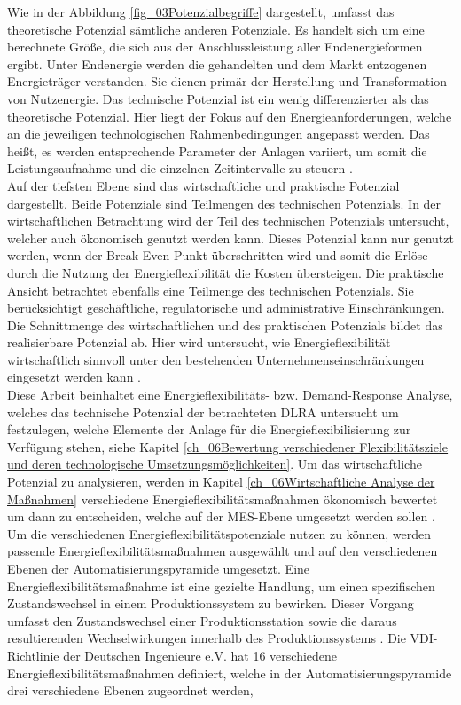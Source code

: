Wie in der Abbildung \ref*{fig_03Potenzialbegriffe} dargestellt, umfasst das theoretische Potenzial sämtliche anderen Potenziale. Es handelt sich um eine berechnete Größe, die sich aus der Anschlussleistung aller Endenergieformen ergibt. Unter Endenergie werden die gehandelten und dem Markt entzogenen Energieträger verstanden. Sie dienen primär der Herstellung und Transformation von Nutzenergie. Das technische Potenzial ist ein wenig differenzierter als das theoretische Potenzial. Hier liegt der Fokus auf den Energieanforderungen, welche an die jeweiligen technologischen Rahmenbedingungen angepasst werden. Das heißt, es werden entsprechende Parameter der Anlagen variiert, um somit die Leistungsaufnahme und die einzelnen Zeitintervalle zu steuern \cite{VDI5207Blatt2020}.\\

Auf der tiefsten Ebene sind das wirtschaftliche und praktische Potenzial dargestellt. Beide Potenziale sind Teilmengen des technischen Potenzials. In der wirtschaftlichen Betrachtung wird der Teil des technischen Potenzials untersucht, welcher auch ökonomisch genutzt werden kann. Dieses Potenzial kann nur genutzt werden, wenn der Break-Even-Punkt überschritten wird und somit die Erlöse durch die Nutzung der Energieflexibilität die Kosten übersteigen. Die praktische Ansicht betrachtet ebenfalls eine Teilmenge des technischen Potenzials. Sie berücksichtigt geschäftliche, regulatorische und administrative Einschränkungen. Die Schnittmenge des wirtschaftlichen und des praktischen Potenzials bildet das realisierbare Potenzial ab. Hier wird untersucht, wie Energieflexibilität wirtschaftlich sinnvoll unter den bestehenden Unternehmenseinschränkungen eingesetzt werden kann \cite{VDI5207Blatt2020}.\\

Diese Arbeit beinhaltet eine Energieflexibilitäts- bzw. Demand-Response Analyse, welches das technische Potenzial der betrachteten DLRA untersucht um festzulegen, welche Elemente der Anlage für die Energieflexibilisierung zur Verfügung stehen, siehe Kapitel \ref{ch_06Bewertung verschiedener Flexibilitätsziele und deren technologische Umsetzungsmöglichkeiten}. Um das wirtschaftliche Potenzial zu analysieren, werden in Kapitel \ref{ch_06Wirtschaftliche Analyse der Maßnahmen} verschiedene Energieflexibilitätsmaßnahmen ökonomisch bewertet um dann zu entscheiden, welche auf der MES-Ebene umgesetzt werden sollen \cite{VDI5207Blatt2020}.\\

Um die verschiedenen Energieflexibilitätspotenziale nutzen zu können, werden passende Energieflexibilitätsmaßnahmen ausgewählt und auf den verschiedenen Ebenen der Automatisierungspyramide umgesetzt. Eine Energieflexibilitätsmaßnahme ist eine gezielte Handlung, um einen spezifischen Zustandswechsel in einem Produktionssystem zu bewirken. Dieser Vorgang umfasst den Zustandswechsel einer Produktionsstation sowie die daraus resultierenden Wechselwirkungen innerhalb des Produktionssystems \cite{VDI5207Blatt2020}. Die VDI-Richtlinie der Deutschen Ingenieure e.V. \cite{VDI5207Blatt2020} hat 16 verschiedene Energieflexibilitätsmaßnahmen definiert, welche in der Automatisierungspyramide drei verschiedene Ebenen zugeordnet werden, 


